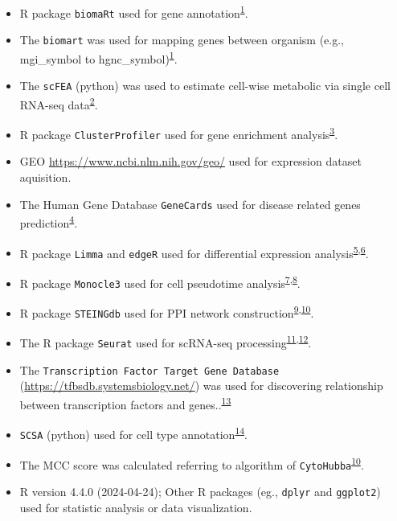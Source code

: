 \documentclass[
]{article}
\providecommand{\tightlist}{%
  \setlength{\itemsep}{0pt}\setlength{\parskip}{0pt}}
\begin{document}
\begin{itemize}
\tightlist
\item
  R package \texttt{biomaRt} used for gene annotation\textsuperscript{\protect\hyperlink{ref-MappingIdentifDurinc2009}{1}}.
\item
  The \texttt{biomart} was used for mapping genes between organism (e.g., mgi\_symbol to hgnc\_symbol)\textsuperscript{\protect\hyperlink{ref-MappingIdentifDurinc2009}{1}}.
\item
  The \texttt{scFEA} (python) was used to estimate cell-wise metabolic via single cell RNA-seq data\textsuperscript{\protect\hyperlink{ref-AGraphNeuralAlgham2021}{2}}.
\item
  R package \texttt{ClusterProfiler} used for gene enrichment analysis\textsuperscript{\protect\hyperlink{ref-ClusterprofilerWuTi2021}{3}}.
\item
  GEO \url{https://www.ncbi.nlm.nih.gov/geo/} used for expression dataset aquisition.
\item
  The Human Gene Database \texttt{GeneCards} used for disease related genes prediction\textsuperscript{\protect\hyperlink{ref-TheGenecardsSStelze2016}{4}}.
\item
  R package \texttt{Limma} and \texttt{edgeR} used for differential expression analysis\textsuperscript{\protect\hyperlink{ref-LimmaPowersDiRitchi2015}{5},\protect\hyperlink{ref-EdgerDifferenChen}{6}}.
\item
  R package \texttt{Monocle3} used for cell pseudotime analysis\textsuperscript{\protect\hyperlink{ref-ReversedGraphQiuX2017}{7},\protect\hyperlink{ref-TheDynamicsAnTrapne2014}{8}}.
\item
  R package \texttt{STEINGdb} used for PPI network construction\textsuperscript{\protect\hyperlink{ref-TheStringDataSzklar2021}{9},\protect\hyperlink{ref-CytohubbaIdenChin2014}{10}}.
\item
  The R package \texttt{Seurat} used for scRNA-seq processing\textsuperscript{\protect\hyperlink{ref-IntegratedAnalHaoY2021}{11},\protect\hyperlink{ref-ComprehensiveIStuart2019}{12}}.
\item
  The \texttt{Transcription\ Factor\ Target\ Gene\ Database} (\url{https://tfbsdb.systemsbiology.net/}) was used for discovering relationship between transcription factors and genes..\textsuperscript{\protect\hyperlink{ref-CausalMechanisPlaisi2016}{13}}
\item
  \texttt{SCSA} (python) used for cell type annotation\textsuperscript{\protect\hyperlink{ref-ScsaACellTyCaoY2020}{14}}.
\item
  The MCC score was calculated referring to algorithm of \texttt{CytoHubba}\textsuperscript{\protect\hyperlink{ref-CytohubbaIdenChin2014}{10}}.
\item
  R version 4.4.0 (2024-04-24); Other R packages (eg., \texttt{dplyr} and \texttt{ggplot2}) used for statistic analysis or data visualization.
\end{itemize}
\end{document}
